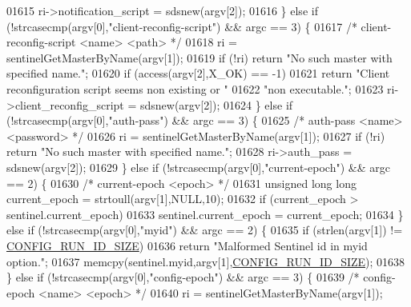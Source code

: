 \begin{DoxyCode}
{{{{{{{{{{{{{{{{{{01615         ri->notification\_script = sdsnew(argv[2]);
01616    \} \textcolor{keywordflow}{else} \textcolor{keywordflow}{if} (!strcasecmp(argv[0],\textcolor{stringliteral}{"client-reconfig-script"}) && argc == 3) \{
01617         \textcolor{comment}{/* client-reconfig-script <name> <path> */}
01618         ri = sentinelGetMasterByName(argv[1]);
01619         \textcolor{keywordflow}{if} (!ri) \textcolor{keywordflow}{return} \textcolor{stringliteral}{"No such master with specified name."};
01620         \textcolor{keywordflow}{if} (access(argv[2],X\_OK) == -1)
01621             \textcolor{keywordflow}{return} \textcolor{stringliteral}{"Client reconfiguration script seems non existing or "}
01622                    \textcolor{stringliteral}{"non executable."};
01623         ri->client\_reconfig\_script = sdsnew(argv[2]);
01624    \} \textcolor{keywordflow}{else} \textcolor{keywordflow}{if} (!strcasecmp(argv[0],\textcolor{stringliteral}{"auth-pass"}) && argc == 3) \{
01625         \textcolor{comment}{/* auth-pass <name> <password> */}
01626         ri = sentinelGetMasterByName(argv[1]);
01627         \textcolor{keywordflow}{if} (!ri) \textcolor{keywordflow}{return} \textcolor{stringliteral}{"No such master with specified name."};
01628         ri->auth\_pass = sdsnew(argv[2]);
01629     \} \textcolor{keywordflow}{else} \textcolor{keywordflow}{if} (!strcasecmp(argv[0],\textcolor{stringliteral}{"current-epoch"}) && argc == 2) \{
01630         \textcolor{comment}{/* current-epoch <epoch> */}
01631         \textcolor{keywordtype}{unsigned} \textcolor{keywordtype}{long} \textcolor{keywordtype}{long} current\_epoch = strtoull(argv[1],NULL,10);
01632         \textcolor{keywordflow}{if} (current\_epoch > sentinel.current\_epoch)
01633             sentinel.current\_epoch = current\_epoch;
01634     \} \textcolor{keywordflow}{else} \textcolor{keywordflow}{if} (!strcasecmp(argv[0],\textcolor{stringliteral}{"myid"}) && argc == 2) \{
01635         \textcolor{keywordflow}{if} (strlen(argv[1]) != \hyperlink{server_8h_aba6794fa3ee28f85165eaed93190f1df}{CONFIG\_RUN\_ID\_SIZE})
01636             \textcolor{keywordflow}{return} \textcolor{stringliteral}{"Malformed Sentinel id in myid option."};
01637         memcpy(sentinel.myid,argv[1],\hyperlink{server_8h_aba6794fa3ee28f85165eaed93190f1df}{CONFIG\_RUN\_ID\_SIZE});
01638     \} \textcolor{keywordflow}{else} \textcolor{keywordflow}{if} (!strcasecmp(argv[0],\textcolor{stringliteral}{"config-epoch"}) && argc == 3) \{
01639         \textcolor{comment}{/* config-epoch <name> <epoch> */}
01640         ri = sentinelGetMasterByName(argv[1]);
}}}}}}}}}}}}}}}}}}
\end{DoxyCode}
